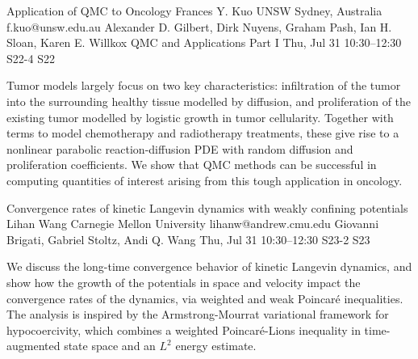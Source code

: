 \begin{talk}
  {Application of QMC to Oncology}%
  {Frances Y. Kuo}%
  {UNSW Sydney, Australia}%
  {f.kuo@unsw.edu.au}%
  {Alexander D. Gilbert, Dirk Nuyens, Graham Pash, Ian H. Sloan, Karen E. Willkox}%
  {QMC and Applications Part I}%
  {Thu, Jul 31 10:30–12:30}%
  {S22-4}%
  {S22}%
				
			
Tumor models largely focus on two key characteristics: infiltration of the tumor into the surrounding healthy tissue modelled by diffusion, and proliferation of the existing tumor modelled by logistic growth in tumor cellularity. Together with terms to model chemotherapy and radiotherapy treatments, these give rise to a nonlinear parabolic reaction-diffusion PDE with random diffusion and proliferation coefficients. We show that QMC methods can be successful in computing quantities of interest arising from this tough application in oncology.

%
%
\end{talk}

\begin{talk}
  {Convergence rates of kinetic Langevin dynamics with weakly confining potentials}%
  {Lihan Wang}%
  {Carnegie Mellon University}%
  {lihanw@andrew.cmu.edu}%
  {Giovanni Brigati, Gabriel Stoltz, Andi Q. Wang}%
  {}%
  {Thu, Jul 31 10:30–12:30}%
  {S23-2}%
  {S23}%
  
				
			
We discuss the long-time convergence behavior of kinetic Langevin dynamics, and show how the growth of the potentials in space and velocity impact the convergence rates of the dynamics, via weighted and weak Poincar\'e inequalities. The analysis is inspired by the Armstrong-Mourrat variational framework for hypocoercivity, which combines a weighted Poincaré-Lions inequality in time-augmented state space and an $L^2$ energy estimate.


\end{talk}


